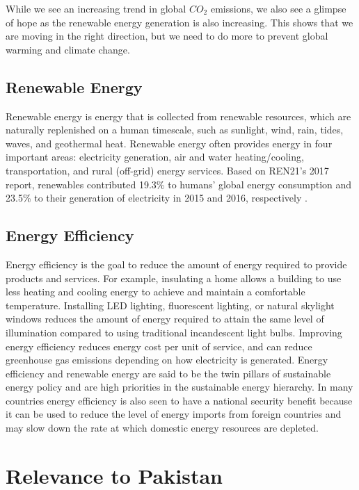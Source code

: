 \documentclass{article}
\begin{document}
While we see an increasing trend in global $CO_2$ emissions, we also see a 
glimpse of hope as the renewable energy generation is also increasing. This
shows that we are moving in the right direction, but we need to do more to
prevent global warming and climate change.
\subsection{Renewable Energy}
Renewable energy is energy that is collected from renewable resources, which
are naturally replenished on a human timescale, such as sunlight, wind, rain,
tides, waves, and geothermal heat. Renewable energy often provides energy in
four important areas: electricity generation, air and water heating/cooling,
transportation, and rural (off-grid) energy services. Based on REN21's 2017
report, renewables contributed 19.3\% to humans' global energy consumption and
23.5\% to their generation of electricity in 2015 and 2016, respectively
\cite{REN21}.

\subsection{Energy Efficiency}
Energy efficiency is the goal to reduce the amount of energy required to
provide products and services. For example, insulating a home allows a building
to use less heating and cooling energy to achieve and maintain a comfortable
temperature. Installing LED lighting, fluorescent lighting, or natural skylight
windows reduces the amount of energy required to attain the same level of
illumination compared to using traditional incandescent light bulbs. Improving
energy efficiency reduces energy cost per unit of service, and can reduce
greenhouse gas emissions depending on how electricity is generated. Energy
efficiency and renewable energy are said to be the twin pillars of sustainable
energy policy and are high priorities in the sustainable energy hierarchy. In
many countries energy efficiency is also seen to have a national security
benefit because it can be used to reduce the level of energy imports from
foreign countries and may slow down the rate at which domestic energy resources
are depleted.

\section{Relevance to Pakistan}
\end{document}

